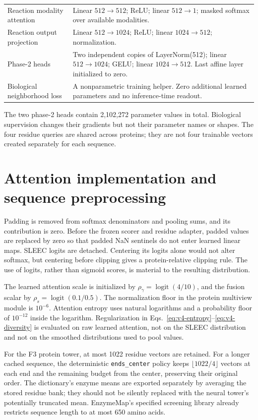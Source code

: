 \begin{longtable}{>{\raggedright\arraybackslash}p{}>{\raggedright\arraybackslash}p{}}
Reaction modality attention & Linear $512\to512$; ReLU; linear $512\to1$; masked softmax over available modalities.\\
Reaction output projection & Linear $512\to1024$; ReLU; linear $1024\to512$; normalization.\\
Phase-2 heads & Two independent copies of LayerNorm(512); linear $512\to1024$; GELU; linear $1024\to512$. Last affine layer initialized to zero.\\
Biological neighborhood loss & A nonparametric training helper. Zero additional learned parameters and no inference-time readout.\\
\bottomrule
\end{longtable}

The two phase-2 heads contain 2,102,272 parameter values in total. Biological
supervision changes their gradients but not their parameter names or shapes.
The four residue queries are shared across proteins; they are not four
trainable vectors created separately for each sequence.

\section{Attention implementation and sequence preprocessing}
\label{app:v4-attention}
Padding is removed from softmax denominators and pooling sums, and its
contribution is zero. Before the frozen scorer and residue adapter, padded
values are replaced by zero so that padded NaN sentinels do not enter learned
linear maps. SLEEC logits are detached. Centering its logits alone would not
alter softmax, but centering before clipping gives a protein-relative clipping
rule. The use of logits, rather than sigmoid scores, is material to the
resulting distribution.

The learned attention scale is initialized by
$\rho_\gamma=\operatorname{logit}(4/10)$, and the fusion scalar by
$\rho_s=\operatorname{logit}(0.1/0.5)$. The normalization floor in the
protein multiview module is $10^{-6}$. Attention entropy uses natural
logarithms and a probability floor of $10^{-12}$ inside the logarithm.
Regularization in Eqs.~\eqref{eq:v4-entropy}--\eqref{eq:v4-diversity} is
evaluated on raw learned attention, not on the SLEEC distribution and not
on the smoothed distributions used to pool values.

For the F3 protein tower, at most 1022 residue vectors are retained. For a
longer cached sequence, the deterministic \texttt{ends\_center} policy keeps
$\lfloor1022/4\rfloor$ vectors at each end and the remaining budget from
the center, preserving their original order. The dictionary's enzyme means
are exported separately by averaging the stored residue bank; they should
not be silently replaced with the neural tower's potentially truncated mean.
EnzymeMap's specified screening library already restricts sequence length
to at most 650 amino acids.

